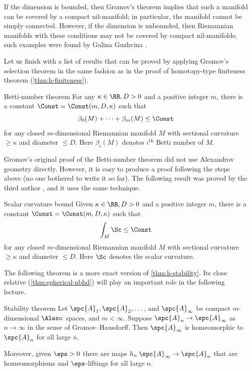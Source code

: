 If the dimension is bounded, then Gromov's theorem \cite{gromov1978} implies that such a manifold can be covered by a compact nil-manifold; in particular, the manifold cannot be simply connected.
However, if  the dimension is unbounded, then Riemannian manifolds with these conditions may not be covered by compact nil-manifolds; such examples were found by Galina Guzhvina \cite{guzhvina2008}.

Let us finish with a list of results that can be proved by applying Gromov's selection theorem
in the same fashion as in the proof of homotopy-type finiteness theorem (\ref{thm:h-finiteness}).

\begin{thm}{Betti-number theorem}\label{thm:betti}
For any   $\kappa\in \RR, D>0$ and a positive integer $m$,
there is a constant $\Const=\Const(m,D,\kappa)$ such that 
\[\beta_0(M)+\dots+\beta_m(M)\le \Const\]
for any closed $m$-dimensional Riemannian manifold $M$ with sectional curvature $\ge \kappa$ and diameter $\le D$.
Here $\beta_i(M)$ denotes $i^\text{th}$ Betti number of $M$.
\end{thm}

Gromov's original proof \cite{gromov-1981} of the Betti-number theorem did not use Alexandrov geometry directly.
However, it is easy to produce a proof following the steps above (no one bothered to write it so far).
The following result was proved by the third author \cite{petrunin2008}, and it uses the same technique.

\begin{thm}{Scalar curvature bound}
Given $\kappa\in \RR, D>0$ and a positive integer $m$, there is a constant $\Const=\Const(m,D,\kappa)$ such that
\[\int_M\Sc\le \Const\]
for any closed $m$-dimensional Riemannian manifold $M$ with sectional curvature $\ge \kappa$ and diameter $\le D$.
Here $\Sc$ denotes the scalar curvature.
\end{thm}

The following theorem is a more exact version of \ref{thm:h-stability}.
Its close relative (\ref{thm:spherical-nbhd}) will play an important role in the following lecture.

\begin{thm}{Stability theorem}\label{thm:stability}
Let $\spc{A}_1,\spc{A}_2,\dots$, and $\spc{A}_\infty$ be compact $m$-dimensional $\Alex\kappa$ spaces, and $m<\infty$.
Suppose $\spc{A}_n\to \spc{A}_\infty$ as $n\to \infty$ in the sense of Gromov--Hausdorff.
Then $\spc{A}_\infty$ is homeomorphic to $\spc{A}_n$ for all large $n$.

Moreover, given $\eps>0$ there are maps $h_n\:\spc{A}_\infty\to \spc{A}_n$ that are homeomorphisms and $\eps$-liftings for all large $n$.
\end{thm}

